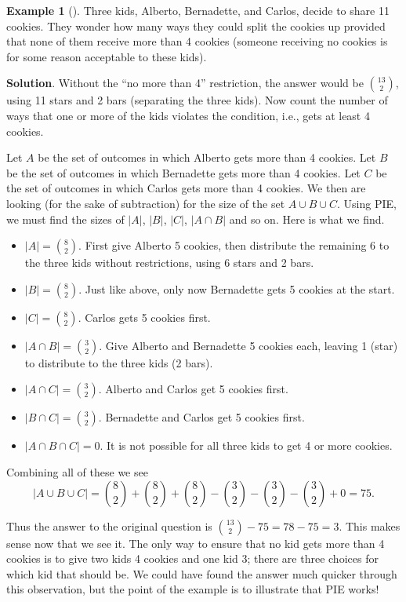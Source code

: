 \documentclass[10pt,]{book}
\theoremstyle{plain}
\theoremstyle{definition}
\theoremstyle{definition}
\newtheorem{example}[theorem]{Example}
\theoremstyle{definition}
\theoremstyle{definition}
\numberwithin{equation}{chapter}
\begin{document}
\begin{example}[]\label{example-11}
\hypertarget{p-841}{}%
Three kids, Alberto, Bernadette, and Carlos, decide to share 11 cookies. They wonder how many ways they could split the cookies up provided that none of them receive more than 4 cookies (someone receiving no cookies is for some reason acceptable to these kids).%
\par\smallskip%
\noindent\textbf{Solution}.\hypertarget{solution-76}{}\quad%
\hypertarget{p-842}{}%
Without the ``no more than 4'' restriction, the answer would be \({13 \choose 2}\), using 11 stars and 2 bars (separating the three kids). Now count the number of ways that one or more of the kids violates the condition, i.e., gets at least 4 cookies.%
\par
\hypertarget{p-843}{}%
Let \(A\) be the set of outcomes in which Alberto gets more than 4 cookies. Let \(B\) be the set of outcomes in which Bernadette gets more than 4 cookies. Let \(C\) be the set of outcomes in which Carlos gets more than 4 cookies. We then are looking (for the sake of subtraction) for the size of the set \(A \cup B \cup C\). Using PIE, we must find the sizes of \(|A|\), \(|B|\), \(|C|\), \(|A\cap B|\) and so on. Here is what we find.%
\par
\hypertarget{p-844}{}%
\leavevmode%
\begin{itemize}[label=\textbullet]
\item{}\(|A| = {8 \choose 2}\). First give Alberto 5 cookies, then distribute the remaining 6 to the three kids without restrictions, using 6 stars and 2 bars.%
\item{}\(|B| = {8 \choose 2}\). Just like above, only now Bernadette gets 5 cookies at the start.%
\item{}\(|C| = {8 \choose 2}\). Carlos gets 5 cookies first.%
\item{}\(|A \cap B| = {3 \choose 2}\). Give Alberto and Bernadette 5 cookies each, leaving 1 (star) to distribute to the three kids (2 bars).%
\item{}\(|A \cap C| = {3 \choose 2}\). Alberto and Carlos get 5 cookies first.%
\item{}\(|B \cap C| = {3 \choose 2}\). Bernadette and Carlos get 5 cookies first.%
\item{}\(|A \cap B \cap C| = 0\). It is not possible for all three kids to get 4 or more cookies.%
\end{itemize}
%
\par
\hypertarget{p-845}{}%
Combining all of these we see%
\begin{equation*}
|A \cup B \cup C| = {8 \choose 2} + {8 \choose 2} + {8 \choose 2} - {3 \choose 2} - {3 \choose 2} - {3 \choose 2} + 0 = 75.
\end{equation*}
%
\par
\hypertarget{p-846}{}%
Thus the answer to the original question is \({13 \choose 2} - 75 = 78 - 75 = 3\). This makes sense now that we see it. The only way to ensure that no kid gets more than 4 cookies is to give two kids 4 cookies and one kid 3; there are three choices for which kid that should be. We could have found the answer much quicker through this observation, but the point of the example is to illustrate that PIE works!%
\end{example}
\end{document}
